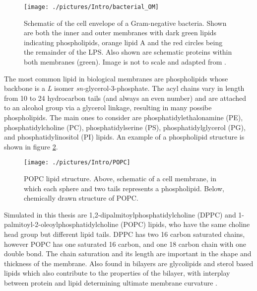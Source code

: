 \begin{figure}[H]
\begin{center}
\texttt{[image: ./pictures/Intro/bacterial\_OM]}
\caption[Schematic of the cell envelope of a Gram-negative bacteria.] {Schematic of the cell envelope of a Gram-negative bacteria. Shown are both the inner and outer membranes with dark green lipids indicating phospholipids, orange lipid A and the red circles being the remainder of the LPS. Also shown are schematic proteins within both membranes (green). Image is not to scale and adapted from \cite{Parkin2015}.}
\label{fig:bacterial_OM}
\end{center}
\end{figure}
\pagebreak

The most common lipid in biological membranes are phospholipids whose backbone is a \textit{L} isomer \textit{sn-}glycerol-3-phosphate. The acyl chains vary in length from 10 to 24 hydrocarbon tails (and always an even number) and are attached to an alcohol group via a glycerol linkage, resulting in many possibe phospholipids. The main ones to consider are phosphatidylethalonamine (PE), phosphatidylcholine (PC), phosphatidylserine (PS), phosphatidylglycerol (PG), and phosphatidylinositol (PI) lipids. An example of a phospholipid structure is shown in figure \ref{fig:POPC}.

\begin{figure}[H]
\begin{center}
\texttt{[image: ./pictures/Intro/POPC]}
\caption[POPC lipid structure.] {POPC lipid structure. Above, schematic of a cell membrane, in which each sphere and two tails represents a phospholipid. Below, chemically drawn structure of POPC.}
\label{fig:POPC}
\end{center}
\end{figure}

Simulated in this thesis are 1,2-dipalmitoylphosphatidylcholine (DPPC) and 1-palmitoyl-2-oleoylphosphatidylcholine (POPC) lipids, who have the same choline head group but different lipid tails. DPPC has two 16 carbon saturated chains, however POPC has one saturated 16 carbon, and one 18 carbon chain with one double bond. The chain saturation and its length are important in the shape and thickness of the membrane. Also found in bilayers are glycolipids and sterol based lipids which also contribute to the properties of the bilayer, with interplay between protein and lipid determining ultimate membrane curvature \cite{McMahon2005,McMahon2015}. 


